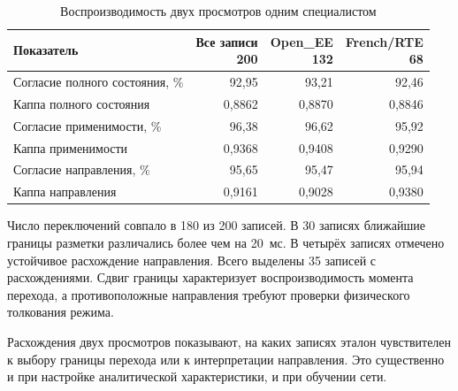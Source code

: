 \begin{table}[htbp]
\centering\small
\caption{Воспроизводимость двух просмотров одним специалистом}
\label{tab:ch5_expert_repeatability}
\begin{tabular}{p{}rrr}
\toprule
Показатель & \shortstack{Все записи\\200}
 & \shortstack{Open\_EE\\132} & \shortstack{French/RTE\\68} \\
\midrule
Согласие полного состояния, \% & 92,95 & 93,21 & 92,46 \\
Каппа полного состояния & 0,8862 & 0,8870 & 0,8846 \\
Согласие применимости, \% & 96,38 & 96,62 & 95,92 \\
Каппа применимости & 0,9368 & 0,9408 & 0,9290 \\
Согласие направления, \% & 95,65 & 95,47 & 95,94 \\
Каппа направления & 0,9161 & 0,9028 & 0,9380 \\
\bottomrule
\end{tabular}
\end{table}

Число переключений совпало в 180 из 200 записей. В 30 записях ближайшие границы разметки
различались более чем на 20~мс. В четырёх записях отмечено устойчивое расхождение
направления. Всего выделены 35 записей с расхождениями. Сдвиг границы характеризует
воспроизводимость момента перехода, а противоположные направления требуют проверки
физического толкования режима.

{}

Расхождения двух просмотров показывают, на каких записях эталон чувствителен к выбору
границы перехода или к интерпретации направления. Это существенно и при настройке
аналитической характеристики, и при обучении сети.

